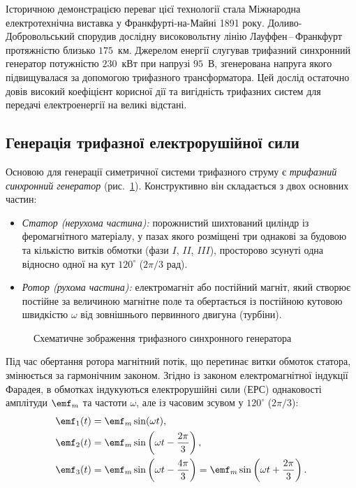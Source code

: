 Історичною демонстрацією переваг цієї технології стала Міжнародна електротехнічна виставка у Франкфурті-на-Майні 1891 року. Доливо-Добровольський спорудив дослідну високовольтну лінію Лауффен\,--\,Франкфурт протяжністю близько \( 175 \)~км. Джерелом енергії слугував трифазний синхронний генератор потужністю \( 230 \)~кВт при напрузі \( 95 \)~В, згенерована напруга якого підвищувалася за допомогою трифазного трансформатора. Цей дослід остаточно довів високий коефіцієнт корисної дії та вигідність трифазних систем для передачі електроенергії на великі відстані.

\subsection*{Генерація трифазної електрорушійної сили}

Основою для генерації симетричної системи трифазного струму є \emph{трифазний синхронний генератор} (рис.~\ref{pic:ThreePhaseGenerator}). Конструктивно він складається з двох основних частин:
\begin{itemize}
    \item \emph{Статор (нерухома частина):} порожнистий шихтований циліндр із феромагнітного матеріалу, у пазах якого розміщені три однакові за будовою та кількістю витків обмотки (фази $I$, $II$, $III$), просторово зсунуті одна відносно одної на кут $120^\circ$ ($2\pi/3$ рад).
    \item \emph{Ротор (рухома частина):} електромагніт або постійний магніт, який створює постійне за величиною магнітне поле та обертається із постійною кутовою швидкістю $\omega$ від зовнішнього первинного двигуна (турбіни).
\end{itemize}

\begin{figure}[h!]
	\centering
	\caption{Схематичне зображення трифазного синхронного генератора}
	\label{pic:ThreePhaseGenerator}
\end{figure}

Під час обертання ротора магнітний потік, що перетинає витки обмоток статора, змінюється за гармонічним законом. Згідно із законом електромагнітної індукції Фарадея, в обмотках індукуються електрорушійні сили (ЕРС) однаковості амплітуди $\emf_m$ та частоти $\omega$, але із часовим зсувом у $120^\circ$ ($2\pi/3$):
\begin{align}
	\emf_1(t) &= \emf_m \sin(\omega t), \notag \\
	\emf_2(t) &= \emf_m \sin\left(\omega t - \frac{2\pi}{3}\right), \label{eq:emf_system} \\
	\emf_3(t) &= \emf_m \sin\left(\omega t - \frac{4\pi}{3}\right) = \emf_m \sin\left(\omega t + \frac{2\pi}{3}\right). \notag
\end{align}

